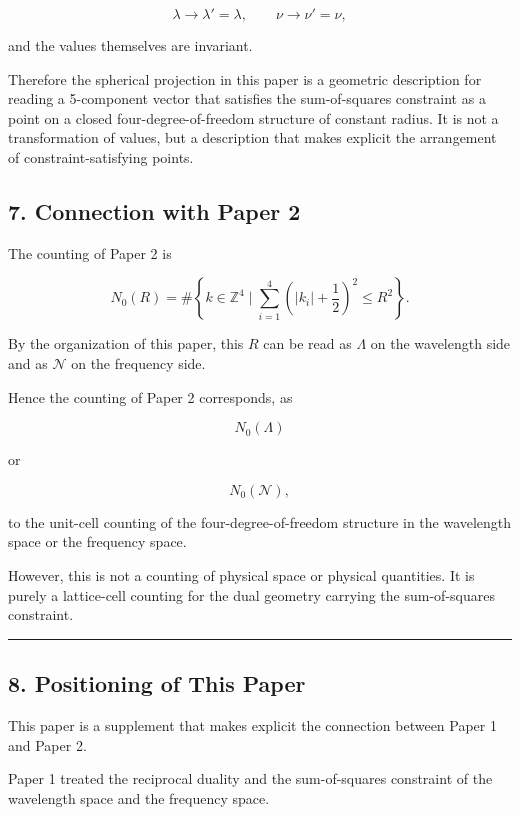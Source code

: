 \documentclass[
]{article}
\begin{document}
\[
\lambda\to\lambda'=\lambda,
\qquad
\nu\to\nu'=\nu ,
\]

and the values themselves are invariant.

Therefore the spherical projection in this paper is a geometric
description for reading a 5-component vector that satisfies the
sum-of-squares constraint as a point on a closed four-degree-of-freedom
structure of constant radius. It is not a transformation of values, but
a description that makes explicit the arrangement of
constraint-satisfying points.

\subsection{7. Connection with Paper 2}\label{connection-with-paper-2}

The counting of Paper 2 is

\[
N_0(R)
=
\#\left\{
k\in\mathbb{Z}^4
\mid
\sum_{i=1}^{4}
\left(|k_i|+\frac12\right)^2
\le R^2
\right\} .
\]

By the organization of this paper, this \(R\) can be read as \(\Lambda\)
on the wavelength side and as \(\mathcal{N}\) on the frequency side.

Hence the counting of Paper 2 corresponds, as

\[
N_0(\Lambda)
\]

or

\[
N_0(\mathcal{N}) ,
\]

to the unit-cell counting of the four-degree-of-freedom structure in the
wavelength space or the frequency space.

However, this is not a counting of physical space or physical
quantities. It is purely a lattice-cell counting for the dual geometry
carrying the sum-of-squares constraint.

\begin{center}\rule{0.5\linewidth}{0.5pt}\end{center}

\subsection{8. Positioning of This
Paper}\label{positioning-of-this-paper}

This paper is a supplement that makes explicit the connection between
Paper 1 and Paper 2.

Paper 1 treated the reciprocal duality and the sum-of-squares constraint
of the wavelength space and the frequency space.
\end{document}
